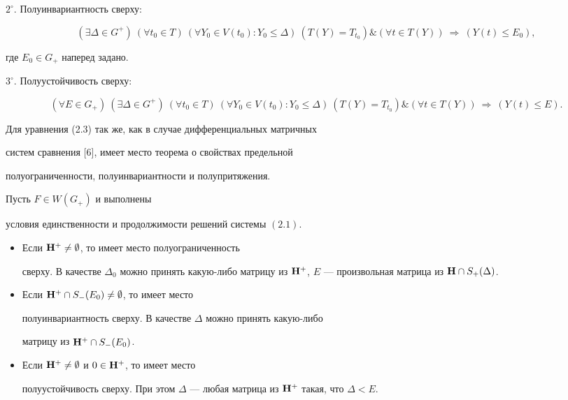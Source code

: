$2^\circ$. Полуинвариантность сверху:


$$


(\exists\Delta\in G^+)\ (\forall t_0\in T)\ (\forall Y_0\in V(t_0):


Y_0\le\Delta)\ (T(Y)=T_{t_0})\&(\forall t\in T(Y))


\ \Rightarrow\ (Y(t)\le E_0),


$$


где $E_0\in G_+$ наперед задано.





$3^\circ$. Полуустойчивость сверху:


$$


(\forall E\in G_+)\ (\exists\Delta\in G^+)


\ (\forall t_0\in T)\ (\forall Y_0\in V(t_0):Y_0\le\Delta)


\ (T(Y)=T_{t_0})\&(\forall t\in T(Y))\ \Rightarrow\ (Y(t)\le E).


$$





Для уравнения (2.3) так же, как в случае дифференциальных матричных


систем сравнения [6], имеет место теорема о свойствах предельной


полуограниченности, полуинвариантности и полупритяжения.





\begin{thm}


Пусть $F\in W(G_+)$ и выполнены


условия единственности и продолжимости решений системы $(2.1)$.


\begin{itemize}


\item[А.] Если $\bold H^+\ne\emptyset$, то имеет место полуограниченность


сверху. В качестве $\Delta_0$ можно принять какую-либо матрицу из $\bold


H^+$, $E$ --- произвольная матрица из $\bold H\cap S_+(\Delta)$.


\item[Б.] Если $\bold H^+\cap S_-(E_0)\ne\emptyset$, то имеет место


полуинвариантность сверху. В качестве $\Delta$ можно принять какую-либо


матрицу из $\bold H^+\cap S_-(E_0)$.


\item[В.] Если $\bold H^+\ne\emptyset$ и $0\in\bold H^+$, то имеет место


полуустойчивость сверху. При этом $\Delta$ --- любая матрица из $\bold


H^+$ такая, что $\Delta<E$.


\end{itemize}


\end{thm}





